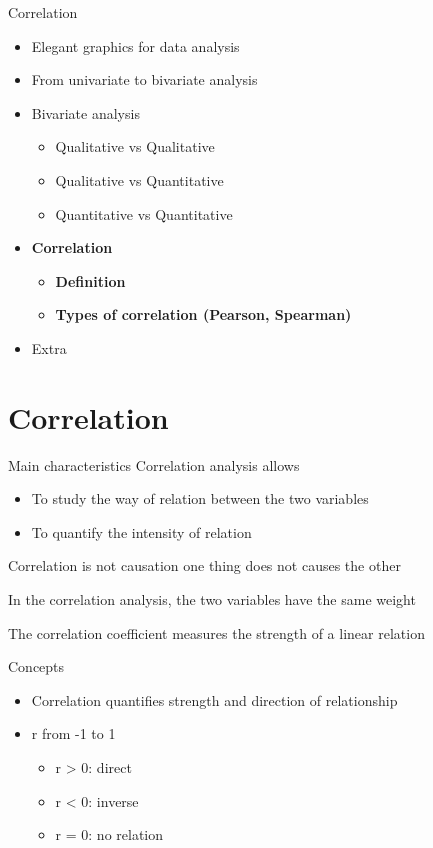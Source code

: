 \documentclass[
  ignorenonframetext,
]{beamer}
\providecommand{\tightlist}{%
  \setlength{\itemsep}{0pt}\setlength{\parskip}{0pt}}
\begin{document}
\begin{frame}{Correlation}
\begin{itemize}
\item
  Elegant graphics for data analysis
\item
  From univariate to bivariate analysis
\item
  Bivariate analysis

  \begin{itemize}
  \item
    Qualitative vs Qualitative
  \item
    Qualitative vs Quantitative
  \item
    Quantitative vs Quantitative
  \end{itemize}
\item
  \textbf{Correlation}

  \begin{itemize}
  \item
    \textbf{Definition}
  \item
    \textbf{Types of correlation (Pearson, Spearman)}
  \end{itemize}
\item
  Extra
\end{itemize}
\end{frame}

\section{Correlation}\label{correlation-1}

\begin{frame}{Main characteristics}
\label{main-characteristics}
Correlation analysis allows

\begin{itemize}
\item
  To study the way of relation between the two variables
\item
  To quantify the intensity of relation
\end{itemize}

Correlation is not causation one thing does not causes the other

In the correlation analysis, the two variables have the same weight

The correlation coefficient measures the strength of a linear relation
\end{frame}

\begin{frame}{Concepts}
\label{concepts}
\begin{itemize}
\tightlist
\item
  Correlation quantifies strength and direction of relationship
\item
  r from -1 to 1

  \begin{itemize}
  \tightlist
  \item
    r \textgreater{} 0: direct
  \item
    r \textless{} 0: inverse
  \item
    r = 0: no relation
  \end{itemize}
\end{itemize}
\end{frame}
\end{document}
